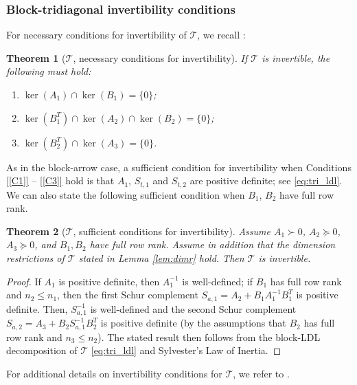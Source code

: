 \documentclass{article}
\newtheorem{theorem}{Theorem}
\newcommand{\spsd}{\succeq 0}
\newcommand{\spd}{\succ 0}
\newcommand{\sT}{\mathcal{T}}
\begin{document}
\subsubsection{Block-tridiagonal invertibility conditions}

For necessary conditions for invertibility of $\sT$, we recall \cite[Proposition 2.1]{bg22}:

\begin{theorem}[$\sT$, necessary conditions for invertibility]
    If $\sT$ is invertible, the following must hold:
    \begin{enumerate}[label=(\roman*)]
        \item $\ker(A_1) \cap \ker(B_1) = \{ 0 \}$;
        \item $\ker(B_1^T) \cap \ker(A_2) \cap \ker(B_2) = \{ 0 \}$;
        \item $\ker(B_2^T) \cap \ker(A_3) = \{ 0 \}$.
    \end{enumerate}
\end{theorem}

As in the block-arrow case, a sufficient condition for invertibility when  Conditions \ref{[C1]} -- \ref{[C3]} hold is that $A_1$, $S_{t,1}$ and $S_{t,2}$ are positive definite; see \eqref{eq:tri_ldl}. We can also state the following sufficient condition when $B_1$, $B_2$ have full row rank.

\begin{theorem}[$\sT$, sufficient conditions for invertibility]
    Assume $A_1\spd$, $A_2\spsd$, $A_3\spsd$, and $B_1,B_2$ have full row rank. Assume in addition that the dimension restrictions of $\sT$ stated in Lemma \ref{lem:dimr} hold. Then $\sT$ is invertible.
\end{theorem}

\begin{proof}
     If $A_1$ is positive definite, then $A_1^{-1}$ is well-defined; if $B_1$ has full row rank and $n_2 \le n_1$, then the first Schur complement $S_{a,1} = A_2 + B_1 A_1^{-1}B_1^T$ is positive definite. Then, $S_{a,1}^{-1}$ is well-defined and the second Schur complement $S_{a,2} = A_3 + B_2 S_{a,1}^{-1}B_2^T$ is positive definite (by the assumptions that $B_2$ has full row rank and $n_3 \le n_2$). The stated result then follows from the block-LDL decomposition of $\sT$ \eqref{eq:tri_ldl} and Sylvester's Law of Inertia.
\end{proof}

For additional details on invertibility conditions for $\sT$, we refer to \cite{bgt24}.
\end{document}
